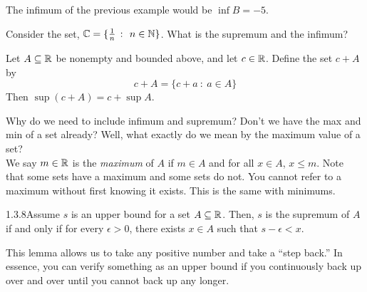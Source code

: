 The infimum of the previous example would be $\inf B = -5$.

\begin{example}
    {}Consider the set, $\C = \{\frac{1}{n} \ \colon \ n \in \N\}$. What is the supremum and the infimum?
\end{example}


\begin{example}
    Let $A \subseteq \mathbb{R}$ be nonempty and bounded above, and let $c \in \mathbb{R}$. Define the set $c + A$ by $$c + A = \{c+a \ \colon \ a \in A\}$$ Then $\sup(c + A) = c + \sup A$.
\end{example}


Why do we need to include infimum and supremum? Don't we have the max and min of a set already? Well, what exactly do we mean by the \gls{maximum value} of a set? \\

We say $m \in \mathbb{R}$ is the \textit{maximum} of $A$ if $m \in A$ and for all $x\in A$, $x \leq m$. Note that some sets have a maximum and some sets do not. You cannot refer to a maximum without first knowing it exists. This is the same with minimums.

\begin{lemma}
    {1.3.8}Assume $s$ is an \gls{upper bound} for a set $A \subseteq \mathbb{R}$. Then, $s$ is the supremum of $A$ if and only if for every $\epsilon > 0$, there exists $x\in A$ such that $s - \epsilon < x$.
\end{lemma}

This lemma allows us to take any positive number and take a ``step back.'' In essence, you can verify something as an upper bound if you continuously back up over and over until you cannot back up any longer.

